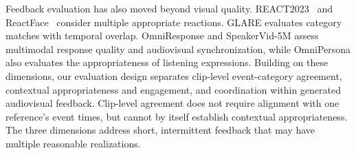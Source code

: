 Feedback evaluation has also moved beyond visual quality. REACT2023~\cite{react2023} and ReactFace~\cite{reactface} consider multiple appropriate reactions. GLARE evaluates category matches with temporal overlap. OmniResponse and SpeakerVid-5M assess multimodal response quality and audiovisual synchronization, while OmniPersona also evaluates the appropriateness of listening expressions. Building on these dimensions, our evaluation design separates clip-level event-category agreement, contextual appropriateness and engagement, and coordination within generated audiovisual feedback. Clip-level agreement does not require alignment with one reference's event times, but cannot by itself establish contextual appropriateness. The three dimensions address short, intermittent feedback that may have multiple reasonable realizations.
